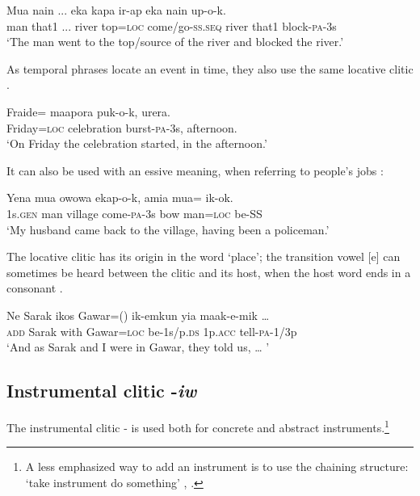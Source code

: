 \ea%
\label{ex:3:x1879}
\gll Mua nain ... eka kapa ir-ap eka nain up-o-k.\\
man that1 ... river top=\textsc{loc} come/go-\textsc{ss}.\textsc{seq} river that1 block-\textsc{pa}-3s\\
\glt`The man went to the top/source of the river and blocked the river.'
\z

\noindent As temporal phrases locate an event in time, they also use the same locative clitic .

\ea%
\label{ex:3:x763}
\gll Fraide= maapora puk-o-k, urera. \\
Friday=\textsc{loc} celebration burst-\textsc{pa}-3s, afternoon.\\
\glt`On Friday the celebration started, in the afternoon.'
\z

\noindent It can also be used with an essive meaning, when referring to people's jobs :

\ea%
\label{ex:3:x765}
\gll Yena mua owowa ekap-o-k, amia mua= ik-ok. \\
1s.\textsc{gen} man village come-\textsc{pa}-3s bow man=\textsc{loc} be-SS \\
\glt`My husband came back to the village, having been a policeman.'
\z

The locative clitic has its origin in the word  `place'; the transition vowel [e] can sometimes be heard between the clitic and its host, when the host word ends in a consonant .

\ea%
\label{ex:3:x764}
\gll Ne Sarak ikos Gawar=() ik-emkun yia maak-e-mik {\dots} \\
\textsc{add} Sarak with Gawar=\textsc{loc} be-1s/p.\textsc{ds} 1p.\textsc{acc} tell-\textsc{pa}-1/3p\\
\glt`And as Sarak and I were in Gawar, they told us, {\dots} '
\z

\subsection{Instrumental clitic -\textit{iw}}\label{sec:3.12.5}
{}
The instrumental clitic -\textstyleStyleVernacularWordsItalic{} is used both for concrete  and abstract  instruments.\footnote{A less emphasized way to add an instrument is to use the chaining structure: `take instrument do something' , .} 

